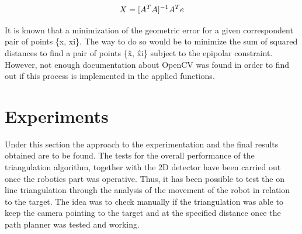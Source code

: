 \begin{equation}
	\centering
	X = [A^{T}A]^{-1}A^{T}e
	\label{eq:LSM_solution}
\end{equation}

It is known that a minimization of the geometric error for a given correspondent pair of points \{x, xi\}. The way to do so would be to minimize the sum of squared distances to find a pair of points \{\^x, \^xi\} subject to the epipolar constraint. However, not enough documentation about OpenCV was found in order to find out if this process is implemented in the applied functions.

\section{Experiments}
Under this section the approach to the experimentation and the final results obtained are to be found.
The tests for the overall performance of the triangulation algorithm, together with the 2D detector have been carried out once the robotics part was operative. 
Thus, it has been possible to test the on line triangulation through the analysis of the movement of the robot in relation to the target. 
The idea was to check manually if the triangulation was able to keep the camera pointing to the target and at the specified distance once the path planner was tested and working.



  